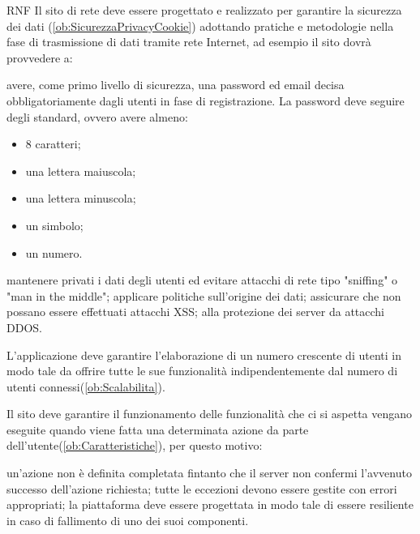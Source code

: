 \begin{listaPersonale}{RNF}
       Il sito di rete deve essere progettato e realizzato per garantire la sicurezza dei dati (\ref{ob:SicurezzaPrivacyCookie}) adottando pratiche e metodologie nella fase di trasmissione di dati tramite rete Internet, ad esempio il sito dovrà provvedere a:
\begin{listaPersonale2}[RNF]{}
             avere, come primo livello di sicurezza, una password ed email decisa obbligatoriamente dagli utenti in fase di registrazione. La password deve seguire degli standard, ovvero avere almeno:
            \begin{itemize}
                  \item 8 caratteri;
                  \item una lettera maiuscola;
                  \item una lettera minuscola;
                  \item un simbolo;
                  \item un numero.
            \end{itemize}
             mantenere privati i dati degli utenti ed evitare attacchi di rete tipo "sniffing" o "man in the middle";
             applicare politiche sull'origine dei dati;
             assicurare che non possano essere effettuati attacchi XSS;
             alla protezione dei server da attacchi DDOS.
      \end{listaPersonale2}

       L'applicazione deve garantire l'elaborazione di un numero crescente di utenti in modo tale da offrire tutte le sue funzionalità indipendentemente dal numero di utenti connessi(\ref{ob:Scalabilita}).

       Il sito deve garantire il funzionamento delle funzionalità che ci si aspetta vengano eseguite quando viene fatta una determinata azione da parte dell'utente(\ref{ob:Caratteristiche}), per questo motivo:
\begin{listaPersonale2}[RNF]{}
             un'azione non è definita completata fintanto che il server non confermi l'avvenuto successo dell'azione richiesta;
             tutte le eccezioni devono essere gestite con errori appropriati;
             la piattaforma deve essere progettata in modo tale di essere resiliente in caso di fallimento di uno dei suoi componenti.
      \end{listaPersonale2}


\end{listaPersonale}
